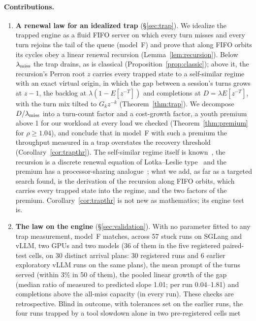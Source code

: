 \paragraph{Contributions.}
\begin{enumerate}[label=(\arabic*),leftmargin=*]
\item \textbf{A renewal law for an idealized trap} (\S\ref{sec:trap}). We idealize the trapped engine as a fluid FIFO server on
which every turn misses and every turn rejoins the tail of the queue (model~F) and prove that along FIFO orbits its cycles obey a
linear renewal recursion (Lemma~\ref{lem:recursion}). Below $\lambda_{\mathrm{miss}}$ the trap drains, as is classical
(Proposition~\ref{prop:classic}); above it, the recursion's Perron root $z$ carries every trapped state to a self-similar regime
with an exact virtual origin, in which the gap between a session's turns grows at $z-1$, the backlog at $\lambda(1-E[z^{-T}])$ and
completions at $D=\lambda E[z^{-T}]$, with the turn mix tilted to $G_kz^{-k}$ (Theorem~\ref{thm:trap}). We decompose $D/\lambda_{\mathrm{miss}}$
into a turn-count factor and a cost-growth factor, a youth premium above 1 for our workload at every load we checked
(Theorem~\ref{thm:premium} for $\rho\ge1.04$), and conclude that in model~F with such a premium the throughput measured in a trap overstates the
recovery threshold (Corollary~\ref{cor:trapthr}). The self-similar regime itself is known~\citep{khanin2001steady}, the
recursion is a discrete renewal equation of Lotka--Leslie type~\citep{feller1968introduction} and the premium has a
processor-sharing analogue~\citep{jeanmarie1994transient}; what we add, as far as a targeted search found, is the derivation of the
recursion along FIFO orbits, which carries every trapped state into the regime, and the two factors of the
premium. Corollary~\ref{cor:trapthr} is not new as mathematics; its engine test is.
\item \textbf{The law on the engine} (\S\ref{sec:validation}). With no parameter fitted to any trap measurement, model~F matches,
across 57 stuck runs on SGLang and vLLM, two GPUs and two models (36 of them in the five registered paired-test cells, on 30 distinct arrival
plans: 30 registered runs and 6 earlier exploratory vLLM runs on the same plans), the mean prompt of the turns served (within 3\% in 50 of them), the pooled linear growth of the gap (median ratio of measured to predicted
slope 1.01; per run 0.04--1.81) and completions above the all-miss capacity (in every run). These checks are retrospective. Blind
in outcome, with tolerances set on the earlier runs, the four runs trapped by a tool slowdown alone in two pre-registered cells met

\end{enumerate}
